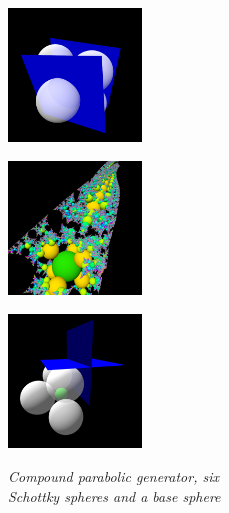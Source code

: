 \begin{figure}[h!tbp]
 \begin{minipage}[t]{0.5\hsize}
  \begin{minipage}{0.25\hsize}
   \center
    \includegraphics[width=1.4in, height=1.4in, keepaspectratio]{./img/application/3dGen/compParabolicGen.pdf}
    \label{fig:compParabolicGen}
  \end{minipage}
  \hspace*{\fill}
  \begin{minipage}{0.25\hsize}
   \center
   \includegraphics[width=1.4in, height=1.4in, keepaspectratio]{./img/application/3dGen/compParabolicOrb.pdf}
   \label{fig:compParabolicOrb}
  \end{minipage}
  \hspace*{\fill}
  \caption{\textit{Compound parabolic generator, six \\Schottky spheres
  and a base sphere}}
  \label{fig:compParabolic}
 \end{minipage}
 \hspace*{\fill}
 \begin{minipage}[t]{0.5\hsize}
  \begin{minipage}{0.25\hsize}
   \center
   \includegraphics[width=1.4in, height=1.4in, keepaspectratio]{./img/application/3dGen/rotationGen.pdf}
   \label{fig:rotationGen}

\end{minipage}
\end{minipage}
\end{figure}
